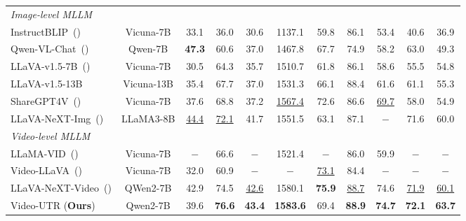 \begin{table*}[t!]
{{\begin{threeparttable}
\begin{tabular}{l c | c c c c c c c c c}
    & & & & & & & & &\\
    \midrule
    \textit{Image-level MLLM} &&&&&&&&&\\
     InstructBLIP~(\citeyear{instructblip}) & Vicuna-7B & 33.1 & 36.0& 30.6   & 1137.1  & 59.8   &  86.1 & 53.4 & 40.6 & 36.9\\ 
     Qwen-VL-Chat~(\citeyear{bai2023qwen}) & Qwen-7B & \bf 47.3 &60.6 &  37.0    & 1467.8  &  67.7  &  74.9 &  58.2 & 63.0 & 49.3\\
      LLaVA-v1.5-7B~(\citeyear{llava1p5}) & Vicuna-7B & 30.5 & 64.3&  35.7   & 1510.7 & 61.8  & 86.1 & 58.6 & 55.5 & 54.8\\
     LLaVA-v1.5-13B & Vicuna-13B& 35.4 & 67.7 &  37.0   & 1531.3 & 66.1   & 88.4  &   61.6 & 61.1 & 55.3 \\
      ShareGPT4V~(\citeyear{chen2023sharegpt4v}) & Vicuna-7B & 37.6 & 68.8 & 37.2 & \underline{1567.4} & 72.6 & 86.6 & \underline{69.7} & 58.0 & 54.9 \\
     LLaVA-NeXT-Img~(\citeyear{llavanext-video}) & LLaMA3-8B & \underline{44.4} & \underline{72.1} & 41.7 & 1551.5 & 63.1 & 87.1 & $-$ & 71.6 & 60.0 \\ 
     \midrule
     \textit{Video-level MLLM} &&&&&&&&&\\
     LLaMA-VID~(\citeyear{llamavid}) & Vicuna-7B & $-$ & 66.6 & $-$  & 1521.4 & $-$ & 86.0  & 59.9 & $-$ & $-$ \\
     Video-LLaVA~(\citeyear{lin2023video}) & Vicuna-7B & 32.0 & 60.9 & $-$  & $-$ & \underline{73.1} & 84.4  & $-$ & $-$ & $-$ \\
    LLaVA-NeXT-Video~(\citeyear{llavanext-video}) & QWen2-7B & 42.9 & 74.5 & \underline{42.6}  & 1580.1 & \bf 75.9 & \underline{88.7}  & 74.6 & \underline{71.9} & \underline{60.1} \\
    \rowcolor{mydred}
    Video-UTR (\textbf{Ours}) & Qwen2-7B & 39.6 & \bf 76.6 & \bf 43.4  & \bf 1583.6 & 69.4 & \bf88.9  &  \bf 74.7 & \bf 72.1 & \bf63.7\\
    \bottomrule
    \end{tabular}

    \end{threeparttable}}
}
  \label{tab:general_image}%
\vspace{-6mm}
\end{table*}%